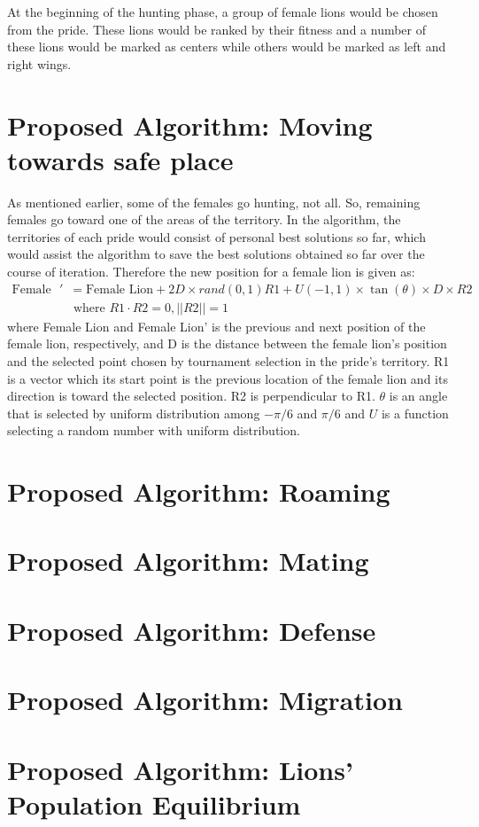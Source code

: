 At the beginning of the hunting phase, a group of female lions would be chosen from the pride. These lions would be ranked by their fitness and a number of these lions would be marked as centers while others would be marked as left and right wings.

\section{Proposed Algorithm: Moving towards safe place}

As mentioned earlier, some of the females go hunting, not all. So, remaining females go toward one of the areas of the territory. In the algorithm, the territories of each pride would consist of personal best solutions so far, which would assist the algorithm to save the best solutions obtained so far over the course of iteration.
Therefore the new position for a female lion is given as:
\begin{align*}
\text{Female Lion}' &= \text{Female Lion} + 2D \times rand(0,1){R1} + U(-1,1) \times \tan(\theta) \times D \times {R2} \\
&\text{  where } R1 \cdot R2 = 0, ||R2|| = 1
\end{align*}
where Female Lion and Female Lion' is the previous and next position of the female lion, respectively, and D is the distance between the female lion's position and the selected point chosen by tournament selection in the pride's territory.
{R1} is a vector which its start point is the previous location of the female lion and its direction is toward the selected position. {R2} is perpendicular to {R1}. $\theta$ is an angle that is selected by uniform distribution among $-\pi/6$ and $\pi/6$ and $U$ is a function selecting a random number with uniform distribution.




\section{Proposed Algorithm: Roaming}

\section{Proposed Algorithm: Mating}

\section{Proposed Algorithm: Defense}
\section{Proposed Algorithm: Migration}
\section{Proposed Algorithm: Lions' Population Equilibrium}
